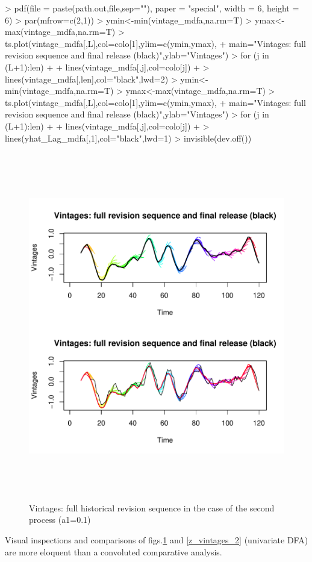 \documentclass[a4paper]{book}
\begin{document}
\begin{enumerate}
\begin{Schunk}
\begin{Sinput}
> pdf(file = paste(path.out,file,sep=""), paper = "special", width = 6, height = 6)
> par(mfrow=c(2,1))
> ymin<-min(vintage_mdfa,na.rm=T)
> ymax<-max(vintage_mdfa,na.rm=T)
> ts.plot(vintage_mdfa[,L],col=colo[1],ylim=c(ymin,ymax),
+ main="Vintages: full revision sequence and final release (black)",ylab="Vintages")
> for (j in (L+1):len)
+ {
+   lines(vintage_mdfa[,j],col=colo[j])
+ }
> lines(vintage_mdfa[,len],col="black",lwd=2)
> ymin<-min(vintage_mdfa,na.rm=T)
> ymax<-max(vintage_mdfa,na.rm=T)
> ts.plot(vintage_mdfa[,L],col=colo[1],ylim=c(ymin,ymax),
+ main="Vintages: full revision sequence and final release (black)",ylab="Vintages")
> for (j in (L+1):len)
+ {
+   lines(vintage_mdfa[,j],col=colo[j])
+ }
> lines(yhat_Lag_mdfa[,1],col="black",lwd=1)
> invisible(dev.off())
\end{Sinput}
\end{Schunk}
\begin{figure}[H]\begin{center}\includegraphics[height=6in, width=6in]{z_vintages_mdfa.pdf}\caption{Vintages: full historical revision sequence in the case of the second process (a1=0.1)\label{z_vintages_mdfa}}\end{center}\end{figure}Visual inspections and comparisons of figs.\ref{z_vintages_mdfa} and \ref{z_vintages_2} (univariate DFA) are more eloquent than a convoluted comparative analysis.

\end{enumerate}
\end{document}
